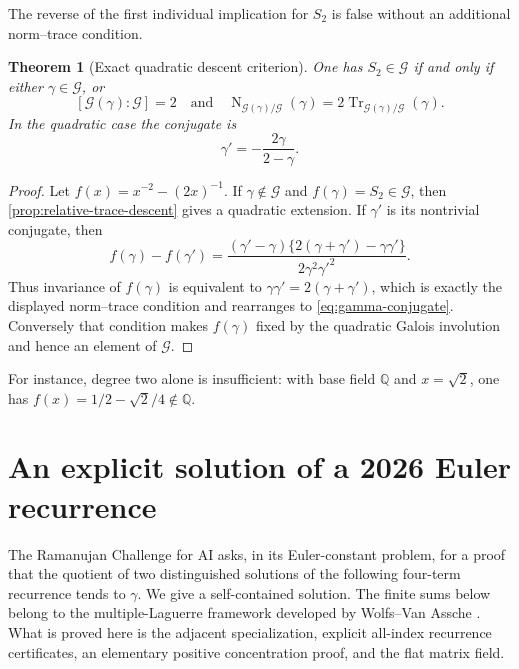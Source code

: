 \documentclass[11pt]{article}
\newtheorem{theorem}{Theorem}[section]
\theoremstyle{definition}
\theoremstyle{remark}
\newcommand{\Q}{\mathbb Q}
\newcommand{\Tr}{\operatorname{Tr}}
\newcommand{\Norm}{\operatorname{N}}
\newcommand{\calG}{\mathcal G}
\begin{document}
The reverse of the first individual implication for \(S_2\) is false without
an additional norm--trace condition.

\begin{theorem}[Exact quadratic descent criterion]
\label{thm:quadratic-descent}
One has \(S_2\in\calG\) if and only if either \(\gamma\in\calG\), or
\[
 [\calG(\gamma):\calG]=2
 \quad\text{and}\quad
 \Norm_{\calG(\gamma)/\calG}(\gamma)
 =2\Tr_{\calG(\gamma)/\calG}(\gamma).
\]
In the quadratic case the conjugate is
\begin{equation}\label{eq:gamma-conjugate}
 \gamma'=-\frac{2\gamma}{2-\gamma}.
\end{equation}
\end{theorem}

\begin{proof}
Let \(f(x)=x^{-2}-(2x)^{-1}\).  If \(\gamma\notin\calG\) and
\(f(\gamma)=S_2\in\calG\), then \cref{prop:relative-trace-descent} gives a
quadratic extension.  If \(\gamma'\) is its nontrivial conjugate, then
\[
 f(\gamma)-f(\gamma')
 =\frac{(\gamma'-\gamma)
 \{2(\gamma+\gamma')-\gamma\gamma'\}}
 {2\gamma^2{\gamma'}^2}.
\]
Thus invariance of \(f(\gamma)\) is equivalent to
\(\gamma\gamma'=2(\gamma+\gamma')\), which is exactly the displayed
norm--trace condition and rearranges to \eqref{eq:gamma-conjugate}.
Conversely that condition makes \(f(\gamma)\) fixed by the quadratic Galois
involution and hence an element of \(\calG\).
\end{proof}

For instance, degree two alone is insufficient: with base field \(\Q\) and
\(x=\sqrt2\), one has
\(f(x)=1/2-\sqrt2/4\notin\Q\).

\section{An explicit solution of a 2026 Euler recurrence}
\label{sec:ramanujan-recurrence}

The Ramanujan Challenge for AI \cite{RamanujanChallenge2026} asks, in its
Euler-constant problem, for a proof that the quotient of two distinguished
solutions of the following four-term recurrence tends to \(\gamma\).  We
give a self-contained solution.  The finite sums below belong to the
multiple-Laguerre framework developed by Wolfs--Van Assche
\cite{WolfsVanAssche2025}.  What is proved here is the adjacent
specialization, explicit all-index recurrence certificates, an elementary
positive concentration proof, and the flat matrix field.
\end{document}
